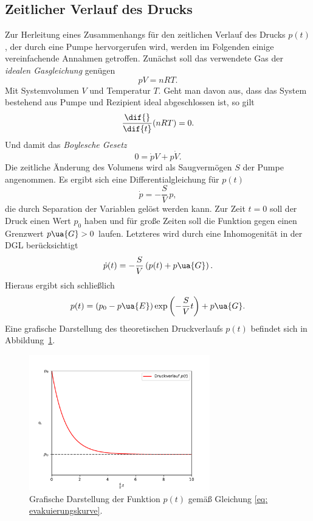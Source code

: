 \subsection{Zeitlicher Verlauf des Drucks}
Zur Herleitung eines Zusammenhangs für den zeitlichen Verlauf des Drucks $p(t)$, der durch eine Pumpe
hervorgerufen wird, werden im Folgenden einige vereinfachende Annahmen getroffen. Zunächst soll das
verwendete Gas der \emph{idealen Gasgleichung} genügen
\begin{equation}
  p V = n R T.
  \label{eq: ideale_gasgleichung}
\end{equation}
Mit Systemvolumen $V$ und Temperatur $T$. Geht man davon aus, dass das System bestehend aus
Pumpe und Rezipient ideal abgeschlossen ist, so gilt
\begin{equation}
  \frac{\dif{}}{\dif{t}}(n R T ) = 0.
\end{equation}
Und damit das \emph{Boylesche Gesetz}
\begin{equation}
  0 = \dot{p}V  + p\dot{V}.
\end{equation}
Die zeitliche Änderung des Volumens wird als Saugvermögen $S$ der Pumpe angenommen. Es ergibt sich eine Differentialgleichung für $p(t)$
\begin{equation}
  \dot{p} = - \frac{S}{V}\, p,
\end{equation}
die durch Separation der Variablen gelöst werden kann. Zur Zeit $t = 0$ soll der Druck einen Wert $p_0$ haben und für große
Zeiten soll die Funktion gegen einen Grenzwert $p\ua{G} > 0$ laufen. Letzteres wird durch eine Inhomogenität in der DGL berücksichtigt
\begin{equation}
  \dot{p}(t) = - \frac{S}{V} \left(p(t) + p\ua{G}\right).
\end{equation}
Hieraus ergibt sich schließlich
\begin{equation}
  p(t) = (p_0 - p\ua{E})\exp\left(- \frac{S}{V} t \right) + p\ua{G}.
  \label{eq: evakuierungskurve}
\end{equation}
Eine grafische Darstellung des theoretischen Druckverlaufs $p(t)$ befindet sich in Abbildung~\ref{fig: theo_p_t}.
\begin{figure}[h]
  \centering
  \includegraphics[width = 0.7\textwidth]{theorie_plots/theo_p.pdf}
  \caption{Grafische Darstellung der Funktion $p(t)$ gemäß Gleichung \eqref{eq: evakuierungskurve}.}
  \label{fig: theo_p_t}
\end{figure}
